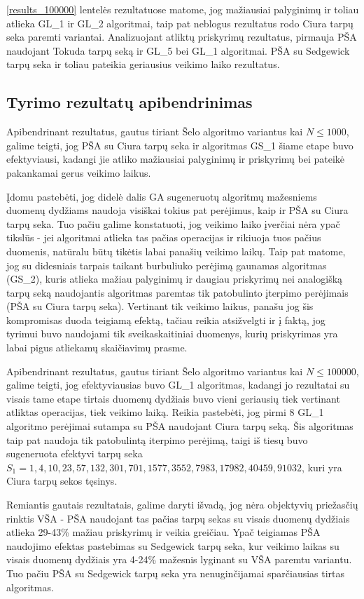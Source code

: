 \documentclass{VUMIFInfKursinis}
\begin{document}
\ref{results_100000} lentelės rezultatuose matome, jog
mažiausiai palyginimų ir toliau atlieka GL\_1 ir GL\_2 algoritmai, taip pat neblogus rezultatus rodo Ciura tarpų seka paremti variantai.
Analizuojant atliktų priskyrimų rezultatus, pirmauja PŠA naudojant Tokuda tarpų seką ir GL\_5 bei GL\_1 algoritmai.
PŠA su Sedgewick tarpų seka ir toliau pateikia geriausius veikimo laiko rezultatus.

\subsection{Tyrimo rezultatų apibendrinimas}

Apibendrinant rezultatus, gautus tiriant Šelo algoritmo variantus kai $N \leq 1000$,
galime teigti, jog PŠA su Ciura tarpų seka ir algoritmas GS\_1 šiame etape buvo efektyviausi,
kadangi jie atliko mažiausiai palyginimų ir priskyrimų bei pateikė pakankamai gerus veikimo laikus.

Įdomu pastebėti, jog didelė dalis GA sugeneruotų algoritmų mažesniems duomenų dydžiams naudoja visiškai tokius pat perėjimus,
kaip ir PŠA su Ciura tarpų seka. Tuo pačiu galime konstatuoti, jog veikimo laiko įverčiai nėra ypač tikslūs -
jei algoritmai atlieka tas pačias operacijas ir rikiuoja tuos pačius duomenis, natūralu būtų tikėtis labai panašių veikimo laikų. 
Taip pat matome, jog su didesniais tarpais taikant burbuliuko perėjimą gaunamas algoritmas (GS\_2), kuris atlieka mažiau palyginimų ir daugiau priskyrimų
nei analogišką tarpų seką naudojantis algoritmas paremtas tik patobulinto įterpimo perėjimais (PŠA su Ciura tarpų seka).
Vertinant tik veikimo laikus, panašu jog šis kompromisas duoda teigiamą efektą, tačiau reikia atsižvelgti ir į faktą, jog tyrimui
buvo naudojami tik sveikaskaitiniai duomenys, kurių priskyrimas yra labai pigus atliekamų skaičiavimų prasme. 

Apibendrinant rezultatus, gautus tiriant Šelo algoritmo variantus kai $N \leq 100000$,
galime teigti, jog efektyviausias buvo GL\_1 algoritmas, kadangi jo rezultatai su visais tame etape tirtais duomenų dydžiais buvo vieni geriausių tiek vertinant atliktas operacijas, tiek veikimo laiką.
Reikia pastebėti, jog pirmi 8 GL\_1 algoritmo perėjimai sutampa su PŠA naudojant Ciura tarpų seką.
Šis algoritmas taip pat naudoja tik patobulintą iterpimo perėjimą, taigi iš tiesų buvo sugeneruota efektyvi tarpų seka ${S_1 = 1, 4, 10, 23, 57, 132, 301, 701, 1577, 3552, 7983, 17982, 40459, 91032}$,
kuri yra Ciura tarpų sekos tęsinys.


Remiantis gautais rezultatais, galime daryti išvadą, jog nėra objektyvių priežasčių rinktis VŠA - 
PŠA naudojant tas pačias tarpų sekas su visais duomenų dydžiais atlieka 29-43\% mažiau priskyrimų ir veikia greičiau. 
Ypač teigiamas PŠA naudojimo efektas pastebimas su Sedgewick tarpų seka, kur veikimo laikas su visais duomenų dydžiais yra 4-24\% mažesnis lyginant su VŠA paremtu variantu.  
Tuo pačiu PŠA su Sedgewick tarpų seka yra nenuginčijamai sparčiausias tirtas algoritmas.
\end{document}
